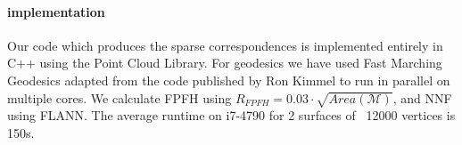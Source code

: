 \documentclass[10pt,twocolumn,letterpaper]{article}
\begin{document}
\paragraph{implementation}
Our code which produces the sparse correspondences is implemented entirely in C++ using the Point Cloud Library. For geodesics we have used  Fast Marching Geodesics adapted from the code published by Ron Kimmel to run in parallel on multiple cores. We calculate FPFH using $R_{FPFH}=0.03\cdot \sqrt{Area(\mathcal{M})}$, and NNF using FLANN. The average runtime on i7-4790 for 2 surfaces of ~12000 vertices is 150s.

{\small
	
	
}
\end{document}
